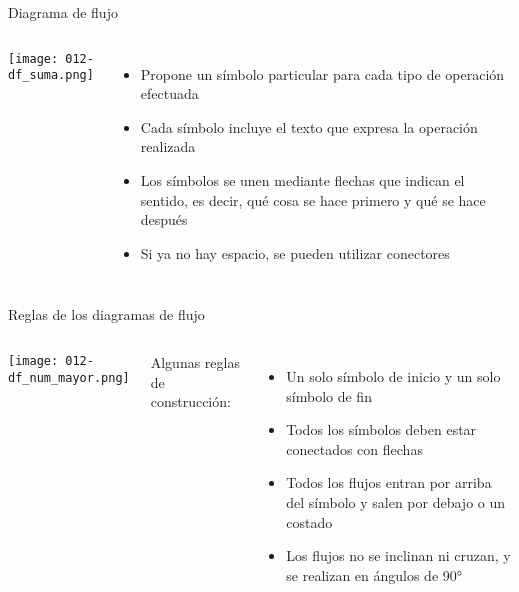 \begin{frame}[c]{Diagrama de flujo}
  \begin{columns}
      \begin{center}
        \texttt{[image: 012-df\_suma.png]}
      \end{center}
      \begin{itemize}
        \item Propone un símbolo particular para cada tipo de operación efectuada
        \pausa
        \item Cada símbolo incluye el texto que expresa la operación realizada
        \pausa
        \item Los símbolos se unen mediante flechas que indican el sentido, es
          decir, qué cosa se hace primero y qué se hace después
        \pausa
        \item Si ya no hay espacio, se pueden utilizar conectores
      \end{itemize}
  \end{columns}
\end{frame}


\begin{frame}[c]{Reglas de los diagramas de flujo}
  \begin{columns}
      \begin{center}
        \texttt{[image: 012-df\_num\_mayor.png]}
      \end{center}
      Algunas reglas de construcción:
      \begin{itemize}
        \item Un solo símbolo de inicio y un solo símbolo de fin
        \pausa
        \item Todos los símbolos deben estar conectados con flechas
        \pausa
        \item Todos los flujos entran por arriba del símbolo y salen por debajo
          o un costado
        \pausa
        \item Los flujos no se inclinan ni cruzan, y se realizan en ángulos de 90°
      \end{itemize}
  \end{columns}
\end{frame}

